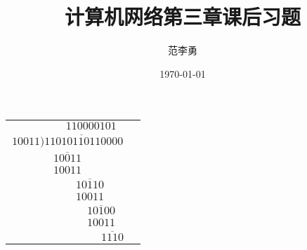 \documentclass{report}%
\begin{document}
\title{计算机网络第三章课后习题}
\author{\kaishu 范李勇}
\date{\today}
\begin{tabular}{cc}
    $\quad \quad \quad \quad \ 110000101$\\     
    $10011\overline{)11010110110000}$\\
    $\overline{10011}$\\
    $10011$\\
    $\quad \quad \quad \quad \overline{10110}$\\
    $\quad \quad \quad \quad 10011$\\
    $\quad \quad \quad \quad \quad \quad \overline{10100}$\\
    $\quad \quad \quad \quad \quad \quad 10011$\\
    $\quad \quad \quad \quad \quad \quad \quad \quad \overline{1110}$
\end{tabular}
\end{document}
